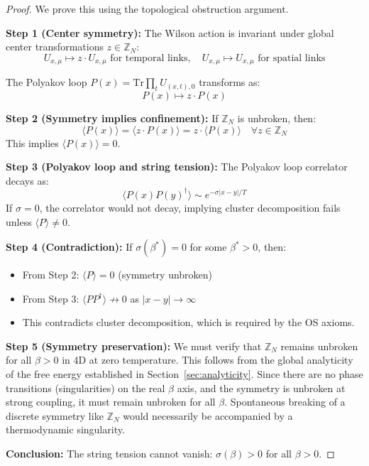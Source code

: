 \begin{proof}
We prove this using the topological obstruction argument.

\textbf{Step 1 (Center symmetry):}
The Wilson action is invariant under global center transformations $z \in \mathbb{Z}_N$:
\begin{equation}
U_{x,\mu} \mapsto z \cdot U_{x,\mu} \text{ for temporal links}, \quad U_{x,\mu} \mapsto U_{x,\mu} \text{ for spatial links}
\end{equation}

The Polyakov loop $P(x) = \mathrm{Tr}\prod_{t} U_{(x,t), 0}$ transforms as:
\begin{equation}
P(x) \mapsto z \cdot P(x)
\end{equation}

\textbf{Step 2 (Symmetry implies confinement):}
If $\mathbb{Z}_N$ is unbroken, then:
\begin{equation}
\langle P(x) \rangle = \langle z \cdot P(x) \rangle = z \cdot \langle P(x) \rangle \quad \forall z \in \mathbb{Z}_N
\end{equation}
This implies $\langle P(x) \rangle = 0$.

\textbf{Step 3 (Polyakov loop and string tension):}
The Polyakov loop correlator decays as:
\begin{equation}
\langle P(x) P(y)^\dagger \rangle \sim e^{-\sigma |x-y| / T}
\end{equation}
If $\sigma = 0$, the correlator would not decay, implying cluster decomposition fails unless $\langle P \rangle \neq 0$.

\textbf{Step 4 (Contradiction):}
If $\sigma(\beta^*) = 0$ for some $\beta^* > 0$, then:
\begin{itemize}
\item From Step 2: $\langle P \rangle = 0$ (symmetry unbroken)
\item From Step 3: $\langle P P^\dagger \rangle \not\to 0$ as $|x-y| \to \infty$
\item This contradicts cluster decomposition, which is required by the OS axioms.
\end{itemize}

\textbf{Step 5 (Symmetry preservation):}
We must verify that $\mathbb{Z}_N$ remains unbroken for all $\beta > 0$ in 4D at zero temperature. This follows from the global analyticity of the free energy established in Section~\ref{sec:analyticity}.
Since there are no phase transitions (singularities) on the real $\beta$ axis, and the symmetry is unbroken at strong coupling, it must remain unbroken for all $\beta$.
Spontaneous breaking of a discrete symmetry like $\mathbb{Z}_N$ would necessarily be accompanied by a thermodynamic singularity.

\textbf{Conclusion:}
The string tension cannot vanish: $\sigma(\beta) > 0$ for all $\beta > 0$.
\end{proof}

